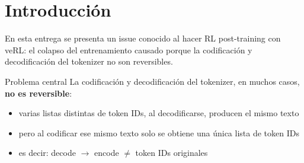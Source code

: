\section{Introducción}
En esta entrega se presenta un issue conocido al hacer RL post-training con veRL: el colapso del entrenamiento causado porque la codificación y decodificación del tokenizer no son reversibles.

\begin{warningbox}{Problema central}
La codificación y decodificación del tokenizer, en muchos casos, \textbf{no es reversible}:
\begin{itemize}
  \item varias listas distintas de token IDs, al decodificarse, producen el mismo texto
  \item pero al codificar ese mismo texto solo se obtiene una única lista de token IDs
  \item es decir: decode $\to$ encode $\neq$ token IDs originales
\end{itemize}
\end{warningbox}

